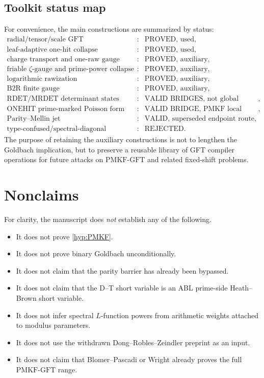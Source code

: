\documentclass[11pt]{article}
\theoremstyle{definition}
\theoremstyle{remark}
\newcommand{\1}{\mathbf 1}
\newcommand{\PMKF}{\mathrm{PMKF}\text{-}\mathrm{GFT}}
\begin{document}
\subsection{Toolkit status map}

For convenience, the main constructions are summarized by status:
\[
\begin{array}{lll}
\text{radial/tensor/scale GFT} &:& \text{PROVED, used},\\
\text{leaf-adaptive one-hit collapse} &:& \text{PROVED, used},\\
\text{charge transport and one-raw gauge} &:& \text{PROVED, auxiliary},\\
\text{friable \(\zeta\)-gauge and prime-power collapse} &:& \text{PROVED, auxiliary},\\
\text{logarithmic rawization} &:& \text{PROVED, auxiliary},\\
\text{B2R finite gauge} &:& \text{PROVED, auxiliary},\\
\text{RDET/MRDET determinant states} &:& \text{VALID BRIDGES, not global solvers},\\
\text{ONEHIT prime-marked Poisson form} &:& \text{VALID BRIDGE, PMKF local model},\\
\text{Parity--Mellin jet} &:& \text{VALID, superseded endpoint route},\\
\text{type-confused/spectral-diagonal shortcuts} &:& \text{REJECTED}.
\end{array}
\]
The purpose of retaining the auxiliary constructions is not to lengthen the
Goldbach implication, but to preserve a reusable library of GFT compiler
operations for future attacks on \(\PMKF\) and related fixed-shift problems.


\section{Nonclaims}

For clarity, the manuscript does \emph{not} establish any of the following.
\begin{itemize}[leftmargin=2em]
\item It does not prove \cref{hyp:PMKF}.
\item It does not prove binary Goldbach unconditionally.
\item It does not claim that the parity barrier has already been bypassed.
\item It does not claim that the D--T short variable is an ABL prime-side Heath--Brown short variable.
\item It does not infer spectral $L$-function powers from arithmetic weights attached to modulus parameters.
\item It does not use the withdrawn Dong--Robles--Zeindler preprint as an input.
\item It does not claim that Blomer--Pascadi or Wright already proves the full $\PMKF$ range.
\end{itemize}
\end{document}
